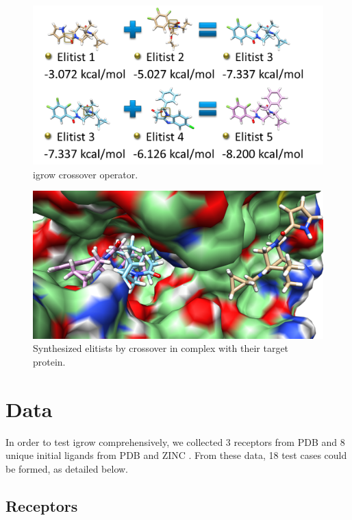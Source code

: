 \documentclass[10pt, conference, compsocconf]{IEEEtran}
\begin{document}
\begin{figure}
\centering
\includegraphics[width=\textwidth]{../igrow/Crossover.png}
\caption{igrow crossover operator.}
\label{igrow:Crossover}
\end{figure}

\begin{figure}
\centering
\includegraphics[width=\textwidth]{../igrow/CrossoverComplex.png}
\caption{Synthesized elitists by crossover in complex with their target protein.}
\label{igrow:CrossoverComplex}
\end{figure}

\section{Data}

In order to test igrow comprehensively, we collected 3 receptors from PDB \cite{96} and 8 unique initial ligands from PDB and ZINC \cite{55}. From these data, 18 test cases could be formed, as detailed below.

\subsection{Receptors}
\end{document}
